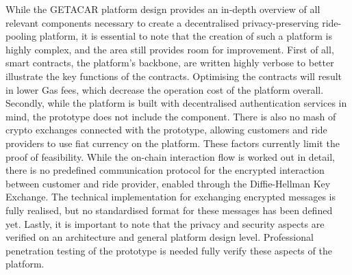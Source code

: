 While the GETACAR platform design provides an in-depth overview of all relevant components necessary to create a decentralised privacy-preserving ride-pooling platform, it is essential to note that the creation of such a platform is highly complex, and the area still provides room for improvement.
First of all, smart contracts, the platform's backbone, are written highly verbose to better illustrate the key functions of the contracts. Optimising the contracts will result in lower Gas fees, which decrease the operation cost of the platform  overall. Secondly, while the platform is built with decentralised authentication services in mind, the prototype does not include the component. There is also no mash of crypto exchanges connected with the prototype, allowing customers and ride providers to use fiat currency on the platform. These factors currently limit the proof of feasibility.
While the on-chain interaction flow is worked out in detail, there is no predefined communication protocol for the encrypted interaction between customer and ride provider, enabled through the Diffie-Hellman Key Exchange. The technical implementation for exchanging encrypted messages is fully realised, but no standardised format for these messages has been defined yet.
Lastly, it is important to note that the privacy and security aspects are verified on an architecture and general platform design level. Professional penetration testing of the prototype is needed fully verify these aspects of the platform. 